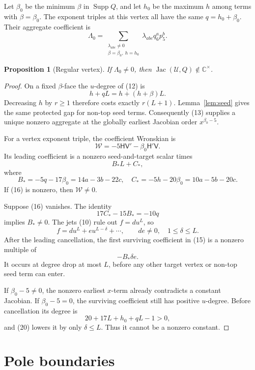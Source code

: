 \documentclass[11pt]{article}
\newtheorem{proposition}[theorem]{Proposition}
\theoremstyle{remark}
\newcommand{\C}{\mathbb C}
\newcommand{\Jac}{\operatorname{Jac}}
\newcommand{\Supp}{\operatorname{Supp}}
\newcommand{\cU}{\mathcal U}
\begin{document}
Let \(\beta_0\) be the minimum \(\beta\) in \(\Supp Q\), and let
\(h_0\) be the maximum \(h\) among terms with \(\beta=\beta_0\).
The exponent triples at this vertex all have the same \(q=h_0+\beta_0\).
Their aggregate coefficient is
\[
\Lambda_0=
\sum_{\substack{\lambda_{abc}\ne0\\
\beta=\beta_0,\ h=h_0}}
\lambda_{abc}q_6^ap_5^b.
\tag{13}
\]

\begin{proposition}[Regular vertex]
\label{prop:regular}
If \(\Lambda_0\ne0\), then
\(\Jac(\cU,Q)\notin\C^\times\).
\end{proposition}

\begin{proof}
On a fixed \(\beta\)-face the \(u\)-degree of (12) is
\[
h+qL=h+(h+\beta)L.
\tag{14}
\]
Decreasing \(h\) by \(r\ge1\) therefore costs exactly
\(r(L+1)\).  Lemma~\ref{lem:seed} gives the same protected gap for
non-top seed terms.  Consequently (13) supplies a unique nonzero
aggregate at the globally earliest Jacobian order
\(x^{\beta_0-5}\).

For a vertex exponent triple, the coefficient Wronskian is
\[
\mathcal W=-5\mathsf H\mathsf V'
-\beta_0\mathsf H'\mathsf V.
\tag{15}
\]
Its leading coefficient is a nonzero seed-and-target scalar times
\[
B_*L+C_*,
\tag{16}
\]
where
\[
B_*=-5q-17\beta_0=14a-3b-22c,
\quad
C_*=-5h-20\beta_0=10a-5b-20c.
\tag{17}
\]
If (16) is nonzero, then \(\mathcal W\ne0\).

Suppose (16) vanishes.  The identity
\[
17C_*-15B_*=-10q
\tag{18}
\]
implies \(B_*\ne0\).  The jets (10) rule out \(f=du^L\), so
\[
f=du^L+eu^{L-\delta}+\cdots,
\qquad de\ne0,\quad1\le\delta\le L.
\tag{19}
\]
After the leading cancellation, the first surviving coefficient in
(15) is a nonzero multiple of
\[
-B_*\delta e.
\tag{20}
\]
It occurs at degree drop at most \(L\), before any other target
vertex or non-top seed term can enter.

If \(\beta_0-5\ne0\), the nonzero earliest \(x\)-term already
contradicts a constant Jacobian.  If \(\beta_0-5=0\), the surviving
coefficient still has positive \(u\)-degree.  Before cancellation its
degree is
\[
20+17L+h_0+qL-1>0,
\]
and (20) lowers it by only \(\delta\le L\).  Thus it cannot be a
nonzero constant.
\end{proof}

\section{Pole boundaries}
\end{document}
